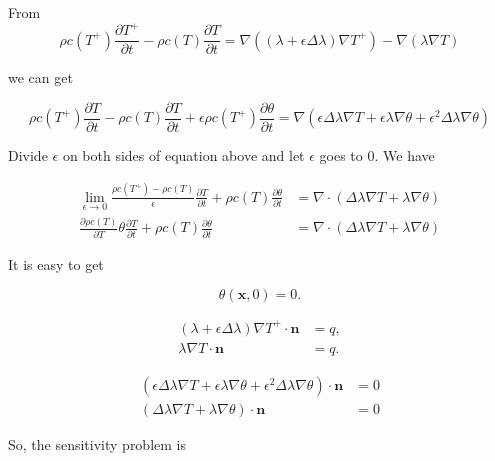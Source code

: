 \documentclass[UTF-8]{article}
\begin{document}
From
\begin{equation}
	\rho c(T^+) \frac{\partial T^+}{\partial t} - \rho c(T) \frac{\partial T}{\partial t} = \nabla \left( (\lambda + \epsilon \Delta \lambda) \nabla T^+ \right) - \nabla \left( \lambda \nabla T \right)
\end{equation}

we can get

\begin{equation}
	\rho c(T^+) \frac{\partial T}{\partial t} - \rho c(T) \frac{\partial T}{\partial t} + \epsilon \rho c(T^+) \frac{\partial \theta}{\partial t} = \nabla \left( \epsilon \Delta \lambda \nabla T + \epsilon \lambda \nabla \theta + \epsilon^2 \Delta \lambda \nabla \theta \right)
\end{equation}

Divide $\epsilon$ on both sides of equation above and let $\epsilon$ goes to 0. We have

\begin{align}
	\lim_{\epsilon \to 0} \frac{\rho c(T^+) - \rho c(T)}{\epsilon} \frac{\partial T}{\partial t} + \rho c(T) \frac{\partial \theta}{\partial t} &= \nabla \cdot \left( \Delta \lambda \nabla T + \lambda \nabla \theta \right) \nonumber \\
	\frac{\partial \rho c(T)}{\partial T} \theta \frac{\partial T}{\partial t} + \rho c(T) \frac{\partial \theta}{\partial t} &= \nabla \cdot \left( \Delta \lambda \nabla T + \lambda \nabla \theta \right) \nonumber
\end{align}

It is easy to get

\begin{equation}
	\theta(\pmb{x}, 0) = 0.
\end{equation}

\begin{align}
	\left( \lambda + \epsilon\Delta \lambda \right) \nabla T^+ \cdot \pmb{n} &= q, \nonumber \\
	\lambda \nabla T \cdot \pmb{n} &= q.
\end{align}

\begin{align}
	\left( \epsilon \Delta \lambda \nabla T + \epsilon \lambda \nabla \theta + \epsilon^2 \Delta \lambda \nabla \theta \right) \cdot \pmb{n} &= 0 \nonumber \\		\left( \Delta \lambda \nabla T + \lambda \nabla \theta \right) \cdot \pmb{n} &= 0
\end{align}

So, the sensitivity problem is
\end{document}
